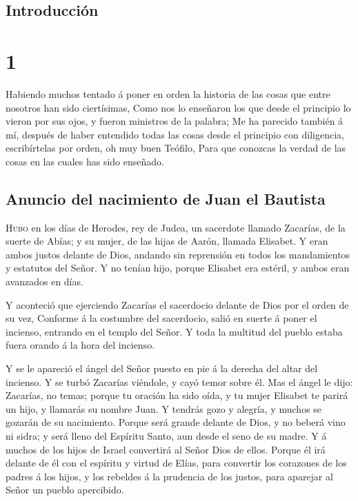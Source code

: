 \hypertarget{introducciuxf3n}{%
\subsection{Introducción}\label{introducciuxf3n}}

\hypertarget{section-42-1}{%
\section{1}\label{section-42-1}}

 Habiendo muchos tentado á poner en orden la historia de
las cosas que entre nosotros han sido ciertísimas,  Como
nos lo enseñaron los que desde el principio lo vieron por sus ojos, y
fueron ministros de la palabra;  Me ha parecido también á
mí, después de haber entendido todas las cosas desde el principio con
diligencia, escribírtelas por orden, oh muy buen Teófilo, 
Para que conozcas la verdad de las cosas en las cuales has sido
enseñado.

\hypertarget{anuncio-del-nacimiento-de-juan-el-bautista}{%
\subsection{Anuncio del nacimiento de Juan el
Bautista}\label{anuncio-del-nacimiento-de-juan-el-bautista}}

 \textsc{Hubo} en los días de Herodes, rey de Judea, un
sacerdote llamado Zacarías, de la suerte de Abías; y su mujer, de las
hijas de Aarón, llamada Elisabet.  Y eran ambos justos
delante de Dios, andando sin reprensión en todos los mandamientos y
estatutos del Señor.  Y no tenían hijo, porque Elisabet
era estéril, y ambos eran avanzados en días.

 Y aconteció que ejerciendo Zacarías el sacerdocio delante
de Dios por el orden de su vez,  Conforme á la costumbre
del sacerdocio, salió en suerte á poner el incienso, entrando en el
templo del Señor.  Y toda la multitud del pueblo estaba
fuera orando á la hora del incienso.

 Y se le apareció el ángel del Señor puesto en pie á la
derecha del altar del incienso.  Y se turbó Zacarías
viéndole, y cayó temor sobre él.  Mas el ángel le dijo:
Zacarías, no temas; porque tu oración ha sido oída, y tu mujer Elisabet
te parirá un hijo, y llamarás su nombre Juan.  Y tendrás
gozo y alegría, y muchos se gozarán de su nacimiento. 
Porque será grande delante de Dios, y no beberá vino ni sidra; y será
lleno del Espíritu Santo, aun desde el seno de su madre. 
Y á muchos de los hijos de Israel convertirá al Señor Dios de ellos.
 Porque él irá delante de él con el espíritu y virtud de
Elías, para convertir los corazones de los padres á los hijos, y los
rebeldes á la prudencia de los justos, para aparejar al Señor un pueblo
apercibido.

